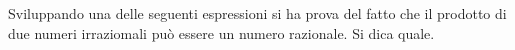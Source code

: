 Sviluppando una delle seguenti espressioni si ha prova del fatto 
che il prodotto di due numeri irraziomali può essere un numero razionale. 
Si dica quale.